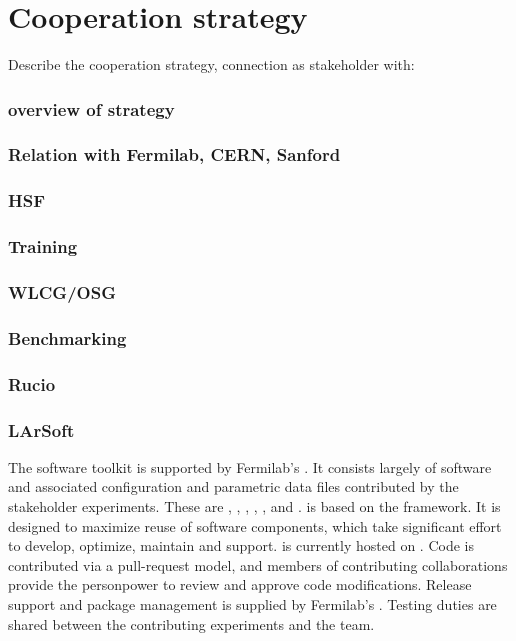 \documentclass[../main-00.tex]{subfiles}
\begin{document}
\chapter{Cooperation strategy }
\label{ch:coop}


Describe the cooperation strategy, connection as stakeholder with:
\subsection{overview of strategy}
\subsection{Relation with Fermilab, CERN, Sanford}
\subsection{HSF }
\subsection{Training }
\subsection{WLCG/OSG }
\subsection{Benchmarking }
\subsection{Rucio }
\subsection{LArSoft }
The  software toolkit is supported by Fermilab's .  It consists largely of software and associated configuration and parametric data files contributed by the stakeholder experiments.  These are , , , , , and .   is based on the  framework.  It is designed to maximize reuse of software components, which take significant effort to develop, optimize, maintain and support.   is currently hosted on .  Code is contributed via a pull-request model, and members of contributing collaborations provide the personpower to review and approve code modifications.  Release support and package management is supplied by Fermilab's .  Testing duties are shared between the contributing experiments and the  team.  
\end{document}
